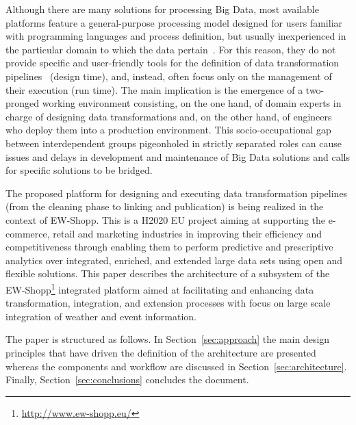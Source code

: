 Although there are many solutions for processing Big Data, most available platforms feature a general-purpose processing model designed for users familiar with programming languages and process definition, but usually inexperienced in the particular domain to which the data pertain~\cite{sukhobok2016tabular}. For this reason, they do not provide specific and user-friendly tools for the definition of data transformation pipelines~\cite{rahm2000data} (design time), and, instead, often focus only on the management of their execution (run time). The main implication is the emergence of a two-pronged working environment consisting, on the one hand, of domain experts in charge of designing data transformations and, on the other hand, of engineers who deploy them into a production environment. This socio-occupational gap between interdependent groups pigeonholed in strictly separated roles can cause issues and delays in development and maintenance of Big Data solutions and calls for specific solutions to be bridged.  

The proposed platform for designing and executing data transformation pipelines (from the cleaning phase to linking and publication) is being realized in the context of EW-Shopp. This is a H2020 EU project aiming at supporting the e-commerce, retail and marketing industries in improving their efficiency and competitiveness through enabling them to perform predictive and prescriptive analytics over integrated, enriched, and extended large data sets using open and flexible solutions. 
This paper describes the architecture of a subsystem of the EW-Shopp\footnote{\url{http://www.ew-shopp.eu/}} integrated platform aimed at facilitating and enhancing data transformation, integration, and extension processes with focus on large scale integration of weather and event information.

The paper is structured as follows. 
In Section~\ref{sec:approach} the main design principles that have driven the definition of the architecture are presented whereas the components and workflow are discussed in Section~\ref{sec:architecture}. %
Finally, Section~\ref{sec:conclusions} concludes the document. 









